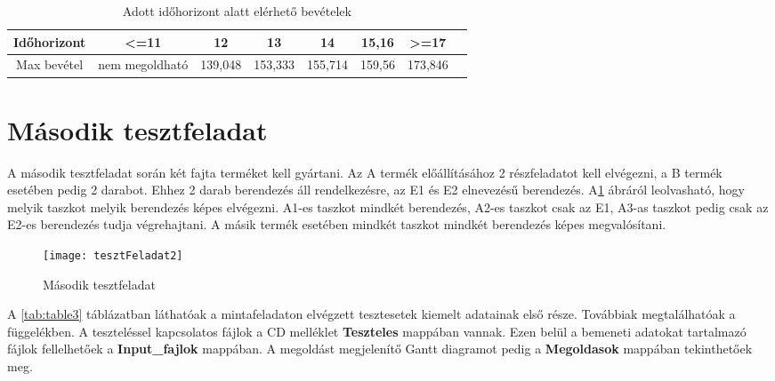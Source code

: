 \begin{table}[H]
	\begin{center}
		\caption{Adott időhorizont alatt elérhető bevételek}
  		\captionsetup[table]{skip=10pt}
    	\label{tab:table2}
		\begin{tabular}{|c|c|c|c|c|c|c|c|}
		\hline
		Időhorizont & \textless =11 & 12 & 13 & 14 & 15,16 & \textgreater =17\\
		\hline
		Max bevétel & nem megoldható & 139,048 & 153,333 & 155,714 & 159,56 & 173,846\\
		\hline
		\end{tabular}	
	\end{center}	
\end{table}

\section{Második tesztfeladat}
A második tesztfeladat során két fajta terméket kell gyártani. Az A termék előállításához 2 részfeladatot kell elvégezni, a B termék esetében pedig 2 darabot. Ehhez 2 darab berendezés áll rendelkezésre, az E1 és E2 elnevezésű berendezés. A\ref{tesztFeladat2} ábráról leolvasható, hogy melyik taszkot melyik berendezés képes elvégezni. A1-es taszkot mindkét berendezés, A2-es taszkot csak az E1, A3-as taszkot pedig csak az E2-es berendezés tudja végrehajtani. A másik termék esetében mindkét taszkot mindkét berendezés képes megvalósítani.

\begin{figure}[H]
\begin{center}
\texttt{[image: tesztFeladat2]}
\caption{Második tesztfeladat}
\label{tesztFeladat2}
\end{center}
\end{figure}

A \ref{tab:table3} táblázatban láthatóak a mintafeladaton elvégzett tesztesetek kiemelt adatainak első része. Továbbiak megtalálhatóak a függelékben. A teszteléssel kapcsolatos fájlok a CD melléklet \textbf{Teszteles} mappában vannak. Ezen belül a bemeneti adatokat tartalmazó fájlok fellelhetőek a \textbf{Input\_fajlok} mappában. A megoldást megjelenítő Gantt diagramot pedig a \textbf{Megoldasok} mappában tekinthetőek meg.

